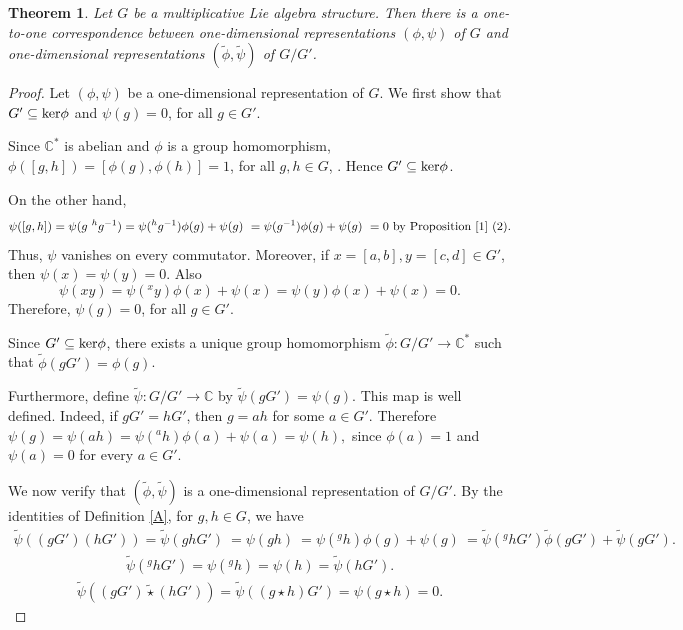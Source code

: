 \documentclass[10 pt,oneside,reqno,a4paper]{amsart}
\newtheorem{theorem}{Theorem}[section]
\numberwithin{equation}{section}
\renewcommand{\ker}{\textnormal{ker}}
\begin{document}

\begin{theorem}
Let $G$ be a multiplicative Lie algebra structure. Then there is a one-to-one correspondence between one-dimensional representations $(\phi,\psi)$ of $G$ and one-dimensional representations $(\widetilde{\phi}, \widetilde{\psi})$ of $G/G'$.
\end{theorem}

\begin{proof}
Let $(\phi,\psi)$ be a one-dimensional representation of $G$. We first show that $G'\subseteq\ker\phi$ and $\psi (g) = 0$, for all $g\in G'$.

Since $\mathbb{C}^{*}$ is abelian and $\phi$ is a group homomorphism, $\phi([g,h])=[\phi(g),\phi(h)]=1$, for all $g,h\in G$, .
Hence $G'\subseteq\ker\phi$.

On the other hand,
\begin{align*}
\psi([g,h])
=\psi(g{}~ ^{h}g^{-1})
=\psi({}^{h}g^{-1})\phi(g)+\psi(g)\
=\psi(g^{-1})\phi(g)+\psi(g)\
=0 ~ \text{by Proposition \ref{1} (2)}.
\end{align*}
Thus, $\psi$ vanishes on every commutator. Moreover, if $x = [a, b] ,y = [c, d]\in G' $, then $\psi (x) = \psi (y) = 0$. Also
\[
\psi(xy)
=\psi({}^{x}y)\phi(x)+\psi(x)
=\psi(y)\phi(x)+\psi(x)=0.
\]
 Therefore, $\psi (g) = 0$, for all $g\in G'$. 

Since $G'\subseteq\ker\phi$, there exists a unique group homomorphism
$\widetilde{\phi}:G/G'\to \mathbb{C}^{*}$
such that $\widetilde{\phi}(gG')=\phi(g)$.

Furthermore, define $\widetilde{\psi}:G/G'\to \mathbb{C}$
by $\widetilde{\psi}(gG')=\psi(g)$.
This map is well defined. Indeed, if $gG'=hG'$, then $g=ah$ for some $a\in G'$. Therefore $\psi(g)=\psi(ah)=\psi({}^{a}h)\phi(a)+\psi(a)=\psi(h),$ since $\phi(a)=1$ and $\psi(a)=0$ for every $a\in G'$.

We now verify that $(\widetilde{\phi},\widetilde{\psi})$ is a one-dimensional representation of $G/G'$. By the identities of Definition \ref{A}, for $g,h\in G$, we have
\begin{align*}
\widetilde{\psi}((gG')(hG'))
=\widetilde{\psi}(ghG')\
=\psi(gh)\
=\psi({}^{g}h)\phi(g)+\psi(g)\
=\widetilde{\psi}({}^{g}hG')\widetilde{\phi}(gG')
+\widetilde{\psi}(gG').
\end{align*}
\begin{align*}
    \widetilde{\psi}({}^{g}hG')
=\psi({}^{g}h)
=\psi(h)
=\widetilde{\psi}(hG').
\end{align*}
\begin{align*}
    \widetilde{\psi}((gG')\widetilde{\star}(hG'))
=\widetilde{\psi}((g\star h)G')
=\psi(g\star h)=0.
\end{align*}



\end{proof}
\end{document}
